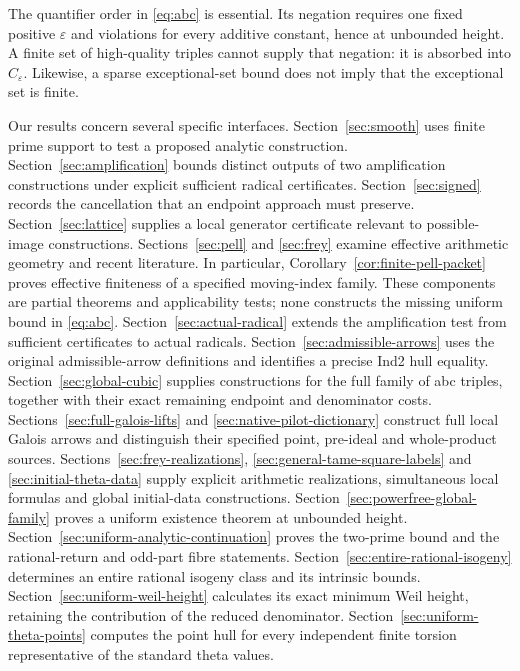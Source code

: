 \documentclass[11pt]{amsart}
\theoremstyle{definition}
\theoremstyle{remark}
\newcommand{\eps}{\varepsilon}
\begin{document}
The quantifier order in \eqref{eq:abc} is essential. Its negation requires
one fixed positive $\eps$ and violations for every additive constant, hence
at unbounded height. A finite set of high-quality triples cannot supply that
negation: it is absorbed into $C_\eps$. Likewise, a sparse exceptional-set
bound does not imply that the exceptional set is finite.

Our results concern several specific interfaces. Section~\ref{sec:smooth}
uses finite prime support to test a proposed analytic construction.
Section~\ref{sec:amplification} bounds distinct outputs of two amplification
constructions under explicit sufficient radical certificates.
Section~\ref{sec:signed} records the cancellation that an endpoint approach
must preserve. Section~\ref{sec:lattice} supplies a local generator
certificate relevant to possible-image constructions. Sections~\ref{sec:pell}
and \ref{sec:frey} examine effective arithmetic geometry and recent
literature. In particular, Corollary~\ref{cor:finite-pell-packet} proves
effective finiteness of a specified moving-index family. These components
are partial theorems and applicability tests; none
constructs the missing uniform bound in \eqref{eq:abc}.
Section~\ref{sec:actual-radical} extends the amplification test from
sufficient certificates to actual radicals. Section~\ref{sec:admissible-arrows}
uses the original admissible-arrow definitions and identifies a precise
Ind2 hull equality. Section~\ref{sec:global-cubic} supplies constructions
for the full family of abc triples, together with their exact remaining
endpoint and denominator costs.
Sections~\ref{sec:full-galois-lifts} and \ref{sec:native-pilot-dictionary}
construct full local Galois arrows and distinguish their specified
point, pre-ideal and whole-product sources.
Sections~\ref{sec:frey-realizations}, \ref{sec:general-tame-square-labels}
and \ref{sec:initial-theta-data} supply explicit arithmetic realizations,
simultaneous local formulas and global initial-data constructions.
Section~\ref{sec:powerfree-global-family} proves a uniform existence
theorem at unbounded height. Section~\ref{sec:uniform-analytic-continuation}
proves the two-prime bound and the rational-return and odd-part fibre
statements. Section~\ref{sec:entire-rational-isogeny} determines an entire
rational isogeny class and its intrinsic bounds.
Section~\ref{sec:uniform-weil-height} calculates its exact minimum Weil
height, retaining the contribution of the reduced denominator.
Section~\ref{sec:uniform-theta-points} computes the point hull for every
independent finite torsion representative of the standard theta values.
\end{document}
